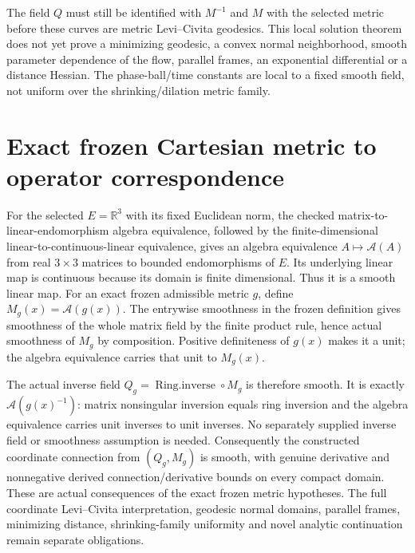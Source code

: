 \documentclass[11pt]{article}
\theoremstyle{definition}
\theoremstyle{remark}
\numberwithin{equation}{section}
\begin{document}
The field $Q$ must still be identified with $M^{-1}$ and $M$ with the
selected metric before these curves are metric Levi--Civita geodesics.
This local solution theorem does not yet prove a minimizing geodesic,
a convex normal neighborhood, smooth parameter dependence of the flow,
parallel frames, an exponential differential or a distance Hessian.
The phase-ball/time constants are local to a fixed smooth field, not
uniform over the shrinking/dilation metric family.

\clearpage
\section{Exact frozen Cartesian metric to operator correspondence}
For the selected $E=\mathbb R^3$ with its fixed Euclidean norm, the checked
matrix-to-linear-endomorphism algebra equivalence, followed by the
finite-dimensional linear-to-continuous-linear equivalence, gives an
algebra equivalence $A\mapsto\mathcal A(A)$ from real $3\times3$ matrices
to bounded endomorphisms of $E$. Its underlying linear map is continuous
because its domain is finite dimensional. Thus it is a smooth linear map.
For an exact frozen admissible metric $g$, define $M_g(x)=\mathcal A(g(x))$.
The entrywise smoothness in the frozen definition gives smoothness of the
whole matrix field by the finite product rule, hence actual smoothness
of $M_g$ by composition. Positive definiteness of $g(x)$ makes it a unit;
the algebra equivalence carries that unit to $M_g(x)$.

The actual inverse field $Q_g=\operatorname{Ring.inverse}\circ M_g$ is
therefore smooth. It is exactly $\mathcal A(g(x)^{-1})$: matrix nonsingular
inversion equals ring inversion and the algebra equivalence carries
unit inverses to unit inverses. No separately supplied inverse field or
smoothness assumption is needed. Consequently the constructed coordinate
connection from $(Q_g,M_g)$ is smooth, with genuine derivative and
nonnegative derived connection/derivative bounds on every compact domain.
These are actual consequences of the exact frozen metric hypotheses.
The full coordinate Levi--Civita interpretation, geodesic normal domains,
parallel frames, minimizing distance, shrinking-family uniformity and
novel analytic continuation remain separate obligations.
\end{document}
